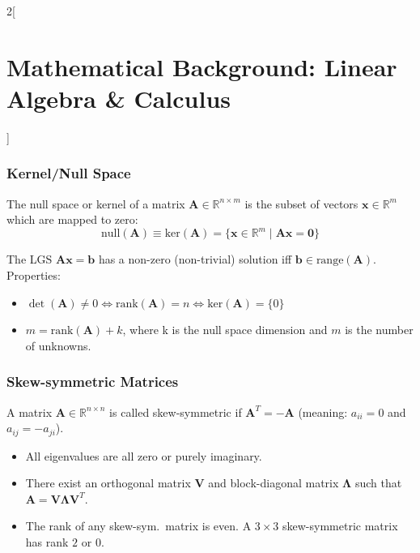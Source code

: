 \documentclass[oneside,fontsize=11pt,paper=a4]{scrartcl}
\begin{document}
\begin{multicols}{2}[\section{Mathematical Background: Linear Algebra \& Calculus}]
\subsubsection{Kernel/Null Space}
The null space or kernel of a matrix $\mathbf{A} \in \mathbb{R}^{n\times m}$ is  the subset of vectors $\textbf{x} \in \mathbb{R}^m$ which are mapped to zero:
\begin{equation*}
    \text{null}(\mathbf{A}) \equiv \text{ker}(\mathbf{A}) = \{\mathbf{x} \in \mathbb{R}^m \mid \mathbf{A}\mathbf{x} = \mathbf{0} \}
\end{equation*}

The LGS $\mathbf{A}\mathbf{x} = \mathbf{b}$ has a non-zero (non-trivial) solution iff $\mathbf{b} \in \text{range}(\mathbf{A})$. Properties:
\begin{itemize}
    \setlength\itemsep{-0.1em}
    \item $\det(\mathbf{A}) \neq 0 \Leftrightarrow \text{rank} (\mathbf{A}) = n \Leftrightarrow \text{ker}(\mathbf{A}) = \{0\}$
    \item $m = \text{rank}(\mathbf{A}) + k$, where k is the null space dimension and $m$ is the number of unknowns.
\end{itemize}

\subsubsection{Skew-symmetric Matrices}
A matrix $\mathbf{A} \in \mathbb{R}^{n \times n} $ is called skew-symmetric if $\mathbf{A}^T = -\mathbf{A}$ (meaning: $a_{ii} = 0$ and $a_{ij} = - a_{ji}$).
\begin{itemize}
    \setlength\itemsep{-0.1em}
    \item All eigenvalues are all zero or purely imaginary.
    \item There exist an orthogonal matrix $\mathbf{V}$ and block-diagonal matrix $\mathbf{\Lambda}$ such that $\mathbf{A} = \mathbf{V} \mathbf{\Lambda} \mathbf{V}^T$.
    \item The rank of any skew-sym.\ matrix is even. A $3\times3$ skew-symmetric matrix has rank $2$ or $0$.
\end{itemize}


\end{multicols}
\end{document}
